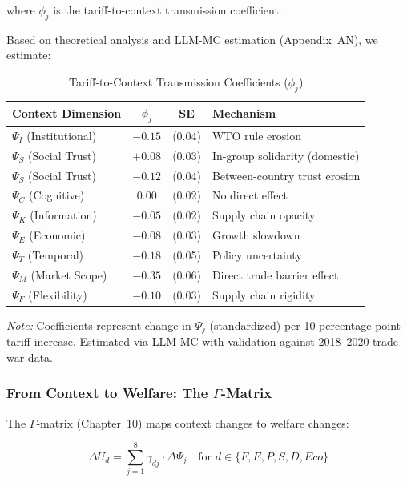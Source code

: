 where $\phi_j$ is the tariff-to-context transmission coefficient.

Based on theoretical analysis and LLM-MC estimation (Appendix~AN), we estimate:

\begin{table}[htbp]
\centering
\caption{Tariff-to-Context Transmission Coefficients ($\phi_j$)}
\label{tab:phi-coefficients}
\small
\begin{tabular}{@{}lccl@{}}
\toprule
\textbf{Context Dimension} & \textbf{$\phi_j$} & \textbf{SE} & \textbf{Mechanism} \\
\midrule
$\Psi_I$ (Institutional) & $-0.15$ & (0.04) & WTO rule erosion \\
$\Psi_S$ (Social Trust) & $+0.08$ & (0.03) & In-group solidarity (domestic) \\
$\Psi_S$ (Social Trust) & $-0.12$ & (0.04) & Between-country trust erosion \\
$\Psi_C$ (Cognitive) & $0.00$ & (0.02) & No direct effect \\
$\Psi_K$ (Information) & $-0.05$ & (0.02) & Supply chain opacity \\
$\Psi_E$ (Economic) & $-0.08$ & (0.03) & Growth slowdown \\
$\Psi_T$ (Temporal) & $-0.18$ & (0.05) & Policy uncertainty \\
$\Psi_M$ (Market Scope) & $-0.35$ & (0.06) & Direct trade barrier effect \\
$\Psi_F$ (Flexibility) & $-0.10$ & (0.03) & Supply chain rigidity \\
\bottomrule
\end{tabular}
\begin{flushleft}
\small\textit{Note:} Coefficients represent change in $\Psi_j$ (standardized) per 10 percentage point tariff increase. Estimated via LLM-MC with validation against 2018--2020 trade war data.
\end{flushleft}
\end{table}

\subsubsection{From Context to Welfare: The $\Gamma$-Matrix}

The $\Gamma$-matrix (Chapter~10) maps context changes to welfare changes:

\begin{equation}
\Delta U_d = \sum_{j=1}^{8} \gamma_{dj} \cdot \Delta \Psi_j \quad \text{for } d \in \{F, E, P, S, D, Eco\}
\label{eq:gamma-welfare}
\end{equation}

